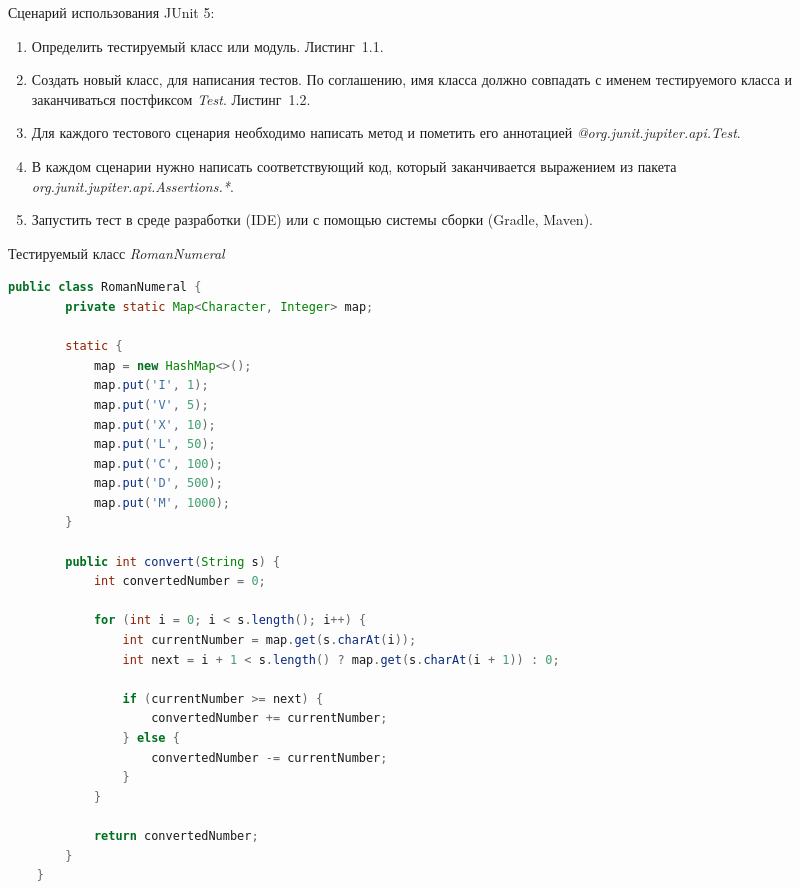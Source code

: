 Сценарий использования JUnit 5: 

\begin{enumerate}
	\item Определить тестируемый класс или модуль. Листинг~1.1.
	\item Создать новый класс, для написания тестов. По соглашению, имя класса должно совпадать с именем тестируемого класса и заканчиваться постфиксом \textit{Test}. Листинг~1.2.
	\item Для каждого тестового сценария необходимо написать метод и пометить его аннотацией \textit{@org.junit.jupiter.api.Test}.
	\item В каждом сценарии нужно написать соответствующий код, который заканчивается выражением из пакета \textit{org.junit.jupiter.api.Assertions.*}. 
	\item Запустить тест в среде разработки (IDE) или с помощью системы сборки (Gradle, Maven).
\end{enumerate}

\begin{ListingEnv}[!h]%
	\captiondelim{ } %
	\caption{Тестируемый класс \textit{RomanNumeral}}
	\begin{lstlisting}[language={Java}]
	public class RomanNumeral {
		private static Map<Character, Integer> map;
		
		static {
			map = new HashMap<>();
			map.put('I', 1);
			map.put('V', 5);
			map.put('X', 10);
			map.put('L', 50);
			map.put('C', 100);
			map.put('D', 500);
			map.put('M', 1000);
		}
		
		public int convert(String s) {
			int convertedNumber = 0;
			
			for (int i = 0; i < s.length(); i++) {
				int currentNumber = map.get(s.charAt(i));
				int next = i + 1 < s.length() ? map.get(s.charAt(i + 1)) : 0;
				
				if (currentNumber >= next) {
					convertedNumber += currentNumber;
				} else {
					convertedNumber -= currentNumber;
				}
			}
			
			return convertedNumber;
		}
	}
	\end{lstlisting}
\end{ListingEnv}%

